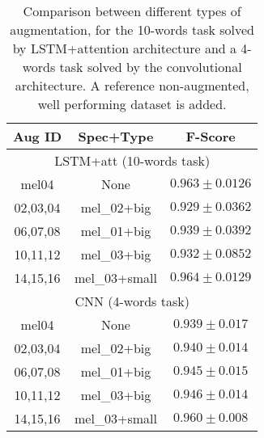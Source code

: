 \begin{table}[t!]
    \centering
    \caption{Comparison between different types of augmentation,
    for the 10-words task solved by LSTM+attention architecture and a
    4-words task solved by the convolutional architecture.
    A reference non-augmented, well performing dataset is added.}
    \label{tab:att_dataset_result_augmentation}
    \begin{tabular}{|cc|c|}
        \hline
        Aug ID & Spec+Type & F-Score \\
        \hline
        \hline
        \multicolumn{3}{|c|}{LSTM+att (10-words task)} \\
        \hline
        mel04   &  None & $0.963 \pm 0.0126$ \\
        02,03,04 & mel\_02+big   &  $0.929 \pm 0.0362$ \\
        06,07,08 & mel\_01+big   &  $0.939 \pm 0.0392$ \\
        10,11,12 & mel\_03+big   &  $0.932 \pm 0.0852$ \\
        14,15,16 & mel\_03+small &  $0.964 \pm 0.0129$ \\
        \hline
        \hline
        \multicolumn{3}{|c|}{CNN (4-words task)} \\
        \hline
        mel04 & None & $0.939 \pm 0.017$ \\
        02,03,04 & mel\_02+big   & $0.940 \pm 0.014$ \\
        06,07,08 & mel\_01+big   & $0.945 \pm 0.015$ \\
        10,11,12 & mel\_03+big   & $0.946 \pm 0.014$ \\
        14,15,16 & mel\_03+small & $0.960 \pm 0.008$ \\
        \hline
    \end{tabular}
\end{table}

